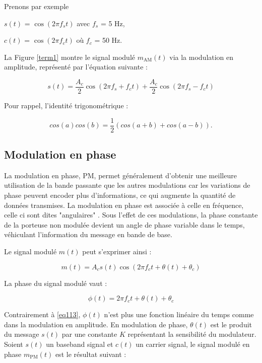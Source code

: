 Prenons par exemple 

$s(t)$ = $\cos(2\pi f_{s}t)$ avec $f_{s}$ = 5 Hz,

$c(t)$ = $\cos(2\pi f_{c}t)$ où $f_{c}$ = 50 Hz.

La Figure \ref{term1} montre le signal modulé $m_\mathrm{AM}(t)$ via la modulation en amplitude, représenté par l'équation suivante :

\begin{equation}\label{eq1140}
s(t) = \frac{A_c}{2} \cos(2\pi f_s + f_c t) + \frac{A_c}{2} \cos(2\pi f_s - f_c t)
\end{equation}

Pour rappel, l'identité trigonométrique :

\begin{equation}\label{eq114}
cos(a)cos(b) = \frac{1}{2} (cos(a+b) + cos(a-b)).
\end{equation}



\subsection{Modulation en phase}

La modulation en phase, \ac{PM}, permet généralement d'obtenir une meilleure utilisation de la bande passante que les autres modulations car les variations de phase peuvent encoder plus d'informations, ce qui augmente la quantité de données transmises. La modulation en phase est associée à celle en fréquence, celle ci sont dites "angulaires" \cite{angle}. Sous l’effet de ces modulations, la phase constante de la porteuse non modulée devient un angle de phase variable dans le temps, véhiculant l’information du message en bande de base.

Le signal modulé $m(t)$ peut s'exprimer ainsi :

\begin{equation}\label{eq1200}
m(t) = A_c s(t) \cos(2 \pi f_c t + \theta(t) + \theta_c)
\end{equation}

La phase du signal modulé vaut :

\begin{equation}\label{eq1201}
\phi (t) = 2 \pi f_c t +\theta(t) + \theta_c 
\end{equation}

Contrairement à \ref{eq113}, $\phi(t)$ n'est plus une fonction linéaire du temps comme dans la modulation en amplitude. En modulation de phase, $\theta(t)$ est le produit du message $s(t)$ par une constante $K$ représentant la sensibilité du modulateur.
Soient $s(t)$ un baseband signal et $c(t)$ un carrier signal, le signal modulé en phase $m_\mathrm{PM}(t)$ est le résultat suivant :


